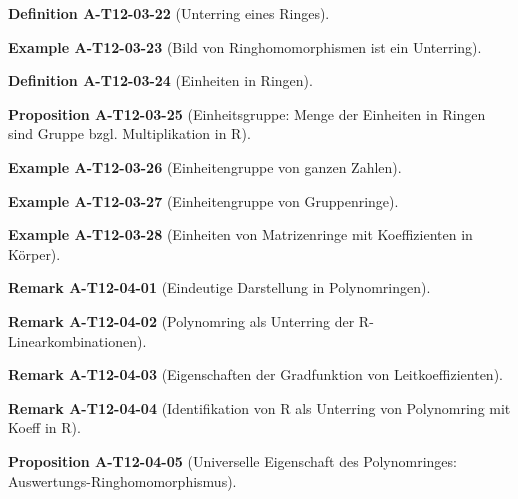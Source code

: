\documentclass[10pt, letterpaper]{article}
\newcommand{\CustomHeading}[3]{%
  \par\medskip\noindent%
  \textbf{#1 #2} \textnormal{(#3)}.\enskip%
}
\newenvironment{DEF}[2]{\CustomHeading{Definition}{#1}{#2}}{}
\newenvironment{PROP}[2]{\CustomHeading{Proposition}{#1}{#2}}{}
\newenvironment{REM}[2]{\CustomHeading{Remark}{#1}{#2}}{}
\newenvironment{EXA}[2]{\CustomHeading{Example}{#1}{#2}}{}
\begin{document}
\begin{DEF}{A-T12-03-22}{Unterring eines Ringes}
\end{DEF}

\begin{EXA}{A-T12-03-23}{Bild von Ringhomomorphismen ist ein Unterring}
\end{EXA}

\begin{DEF}{A-T12-03-24}{Einheiten in Ringen}
\end{DEF}

\begin{PROP}{A-T12-03-25}{Einheitsgruppe: Menge der Einheiten in Ringen sind Gruppe bzgl. Multiplikation in R}
\end{PROP}

\begin{EXA}{A-T12-03-26}{Einheitengruppe von ganzen Zahlen}
\end{EXA}

\begin{EXA}{A-T12-03-27}{Einheitengruppe von Gruppenringe}
\end{EXA}

\begin{EXA}{A-T12-03-28}{Einheiten von Matrizenringe mit Koeffizienten in Körper}
\end{EXA}

\begin{REM}{A-T12-04-01}{Eindeutige Darstellung in Polynomringen}
\end{REM}

\begin{REM}{A-T12-04-02}{Polynomring als Unterring der R-Linearkombinationen}
\end{REM}

\begin{REM}{A-T12-04-03}{Eigenschaften der Gradfunktion von Leitkoeffizienten}
\end{REM}

\begin{REM}{A-T12-04-04}{Identifikation von R als Unterring von Polynomring mit Koeff in R}
\end{REM}

\begin{PROP}{A-T12-04-05}{Universelle Eigenschaft des Polynomringes: Auswertungs-Ringhomomorphismus}
\end{PROP}
\end{document}
